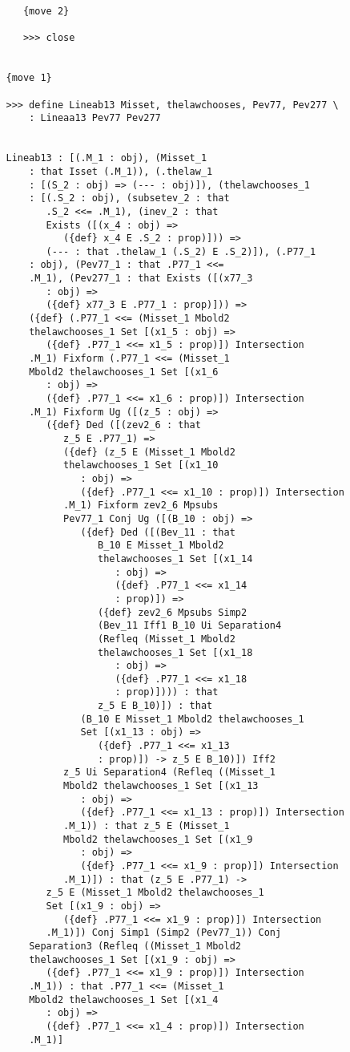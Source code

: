 \documentclass[12pt]{article}
\begin{document}
\begin{verbatim}
      {move 2}

      >>> close


   {move 1}

   >>> define Lineab13 Misset, thelawchooses, Pev77, Pev277 \
       : Lineaa13 Pev77 Pev277


   Lineab13 : [(.M_1 : obj), (Misset_1 
       : that Isset (.M_1)), (.thelaw_1 
       : [(S_2 : obj) => (--- : obj)]), (thelawchooses_1 
       : [(.S_2 : obj), (subsetev_2 : that 
          .S_2 <<= .M_1), (inev_2 : that 
          Exists ([(x_4 : obj) => 
             ({def} x_4 E .S_2 : prop)])) => 
          (--- : that .thelaw_1 (.S_2) E .S_2)]), (.P77_1 
       : obj), (Pev77_1 : that .P77_1 <<= 
       .M_1), (Pev277_1 : that Exists ([(x77_3 
          : obj) => 
          ({def} x77_3 E .P77_1 : prop)])) => 
       ({def} (.P77_1 <<= (Misset_1 Mbold2 
       thelawchooses_1 Set [(x1_5 : obj) => 
          ({def} .P77_1 <<= x1_5 : prop)]) Intersection 
       .M_1) Fixform (.P77_1 <<= (Misset_1 
       Mbold2 thelawchooses_1 Set [(x1_6 
          : obj) => 
          ({def} .P77_1 <<= x1_6 : prop)]) Intersection 
       .M_1) Fixform Ug ([(z_5 : obj) => 
          ({def} Ded ([(zev2_6 : that 
             z_5 E .P77_1) => 
             ({def} (z_5 E (Misset_1 Mbold2 
             thelawchooses_1 Set [(x1_10 
                : obj) => 
                ({def} .P77_1 <<= x1_10 : prop)]) Intersection 
             .M_1) Fixform zev2_6 Mpsubs 
             Pev77_1 Conj Ug ([(B_10 : obj) => 
                ({def} Ded ([(Bev_11 : that 
                   B_10 E Misset_1 Mbold2 
                   thelawchooses_1 Set [(x1_14 
                      : obj) => 
                      ({def} .P77_1 <<= x1_14 
                      : prop)]) => 
                   ({def} zev2_6 Mpsubs Simp2 
                   (Bev_11 Iff1 B_10 Ui Separation4 
                   (Refleq (Misset_1 Mbold2 
                   thelawchooses_1 Set [(x1_18 
                      : obj) => 
                      ({def} .P77_1 <<= x1_18 
                      : prop)]))) : that 
                   z_5 E B_10)]) : that 
                (B_10 E Misset_1 Mbold2 thelawchooses_1 
                Set [(x1_13 : obj) => 
                   ({def} .P77_1 <<= x1_13 
                   : prop)]) -> z_5 E B_10)]) Iff2 
             z_5 Ui Separation4 (Refleq ((Misset_1 
             Mbold2 thelawchooses_1 Set [(x1_13 
                : obj) => 
                ({def} .P77_1 <<= x1_13 : prop)]) Intersection 
             .M_1)) : that z_5 E (Misset_1 
             Mbold2 thelawchooses_1 Set [(x1_9 
                : obj) => 
                ({def} .P77_1 <<= x1_9 : prop)]) Intersection 
             .M_1)]) : that (z_5 E .P77_1) -> 
          z_5 E (Misset_1 Mbold2 thelawchooses_1 
          Set [(x1_9 : obj) => 
             ({def} .P77_1 <<= x1_9 : prop)]) Intersection 
          .M_1)]) Conj Simp1 (Simp2 (Pev77_1)) Conj 
       Separation3 (Refleq ((Misset_1 Mbold2 
       thelawchooses_1 Set [(x1_9 : obj) => 
          ({def} .P77_1 <<= x1_9 : prop)]) Intersection 
       .M_1)) : that .P77_1 <<= (Misset_1 
       Mbold2 thelawchooses_1 Set [(x1_4 
          : obj) => 
          ({def} .P77_1 <<= x1_4 : prop)]) Intersection 
       .M_1)]



\end{verbatim}
\end{document}
